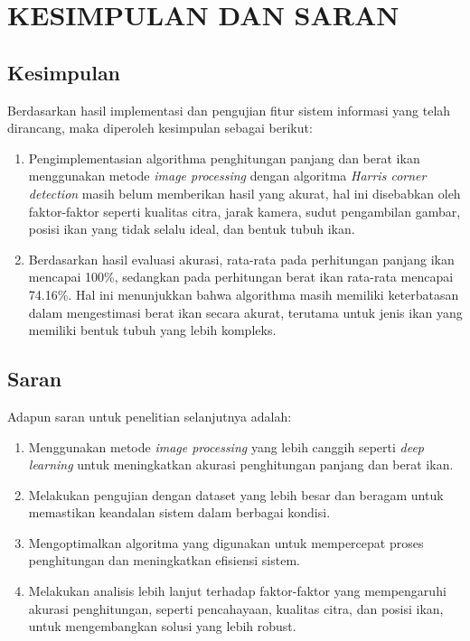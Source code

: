
\chapter{KESIMPULAN DAN SARAN}

\section{Kesimpulan}
Berdasarkan hasil implementasi dan pengujian fitur sistem informasi yang telah dirancang, maka diperoleh kesimpulan sebagai berikut:

\begin{enumerate}
	\item Pengimplementasian algorithma penghitungan panjang dan berat ikan menggunakan metode \textit{image processing} dengan algoritma \textit{Harris corner detection} masih belum memberikan hasil yang akurat, hal ini disebabkan oleh faktor-faktor seperti kualitas citra, jarak kamera, sudut pengambilan gambar, posisi ikan yang tidak selalu ideal, dan bentuk tubuh ikan.
	\item Berdasarkan hasil evaluasi akurasi, rata-rata pada perhitungan panjang ikan mencapai 100\%, sedangkan pada perhitungan berat ikan rata-rata mencapai 74.16\%. Hal ini menunjukkan bahwa algorithma masih memiliki keterbatasan dalam mengestimasi berat ikan secara akurat, terutama untuk jenis ikan yang memiliki bentuk tubuh yang lebih kompleks.
\end{enumerate}

\section{Saran}
Adapun saran untuk penelitian selanjutnya adalah:
\begin{enumerate} 
	\item Menggunakan metode \textit{image processing} yang lebih canggih seperti \textit{deep learning} untuk meningkatkan akurasi penghitungan panjang dan berat ikan.
	\item Melakukan pengujian dengan dataset yang lebih besar dan beragam untuk memastikan keandalan sistem dalam berbagai kondisi.
	\item Mengoptimalkan algoritma yang digunakan untuk mempercepat proses penghitungan dan meningkatkan efisiensi sistem.
	\item Melakukan analisis lebih lanjut terhadap faktor-faktor yang mempengaruhi akurasi penghitungan, seperti pencahayaan, kualitas citra, dan posisi ikan, untuk mengembangkan solusi yang lebih robust.
\end{enumerate}

